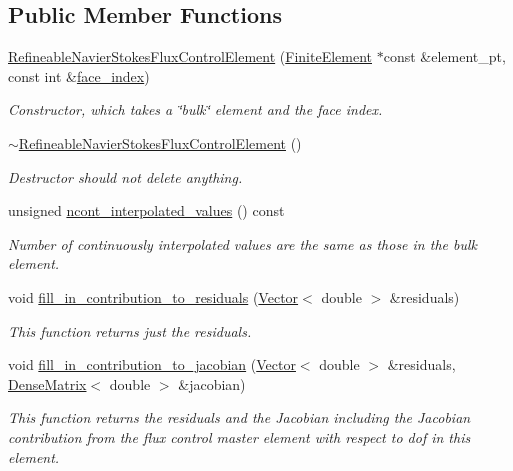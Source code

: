 \subsection*{Public Member Functions}
\begin{DoxyCompactItemize}
\item 
\hyperlink{classoomph_1_1RefineableNavierStokesFluxControlElement_aef769904942c35ba967e427d02e540e5}{Refineable\+Navier\+Stokes\+Flux\+Control\+Element} (\hyperlink{classoomph_1_1FiniteElement}{Finite\+Element} $\ast$const \&element\+\_\+pt, const int \&\hyperlink{classoomph_1_1FaceElement_a478d577ac6db67ecc80f1f02ae3ab170}{face\+\_\+index})
\begin{DoxyCompactList}\small\item\em Constructor, which takes a \char`\"{}bulk\char`\"{} element and the face index. \end{DoxyCompactList}\item 
\hyperlink{classoomph_1_1RefineableNavierStokesFluxControlElement_aa45fbbe095fe8bad7b97bd59b8242e56}{$\sim$\+Refineable\+Navier\+Stokes\+Flux\+Control\+Element} ()
\begin{DoxyCompactList}\small\item\em Destructor should not delete anything. \end{DoxyCompactList}\item 
unsigned \hyperlink{classoomph_1_1RefineableNavierStokesFluxControlElement_a047277ea9c38d3d411b3734c59b64435}{ncont\+\_\+interpolated\+\_\+values} () const
\begin{DoxyCompactList}\small\item\em Number of continuously interpolated values are the same as those in the bulk element. \end{DoxyCompactList}\item 
void \hyperlink{classoomph_1_1RefineableNavierStokesFluxControlElement_ad1b969e5a71a212e297ece3a07b9f5cb}{fill\+\_\+in\+\_\+contribution\+\_\+to\+\_\+residuals} (\hyperlink{classoomph_1_1Vector}{Vector}$<$ double $>$ \&residuals)
\begin{DoxyCompactList}\small\item\em This function returns just the residuals. \end{DoxyCompactList}\item 
void \hyperlink{classoomph_1_1RefineableNavierStokesFluxControlElement_a46659967091dc0f672d91f2ac339c304}{fill\+\_\+in\+\_\+contribution\+\_\+to\+\_\+jacobian} (\hyperlink{classoomph_1_1Vector}{Vector}$<$ double $>$ \&residuals, \hyperlink{classoomph_1_1DenseMatrix}{Dense\+Matrix}$<$ double $>$ \&jacobian)
\begin{DoxyCompactList}\small\item\em This function returns the residuals and the Jacobian including the Jacobian contribution from the flux control master element with respect to dof in this element. \end{DoxyCompactList}\end{DoxyCompactItemize}
